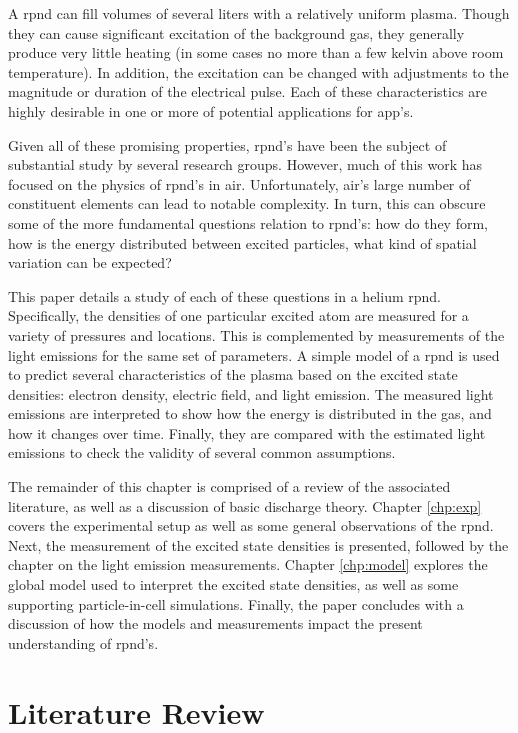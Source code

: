 A \acs{rpnd} can fill volumes of several liters with a relatively uniform
plasma. Though they can cause significant excitation of the background gas, they
generally produce very little heating (in some cases no more than a few kelvin
above room temperature). In addition, the excitation can be changed with
adjustments to the magnitude or duration of the electrical pulse. Each of these
characteristics are highly desirable in one or more of potential applications
for \acs{app}'s.

Given all of these promising properties, \acs{rpnd}'s have been the subject of
substantial study by several research groups. However, much of this work has
focused on the physics of \acs{rpnd}'s in air. Unfortunately, air's large number
of constituent elements can lead to notable complexity. In turn, this can
obscure some of the more fundamental questions relation to \acs{rpnd}'s: how do
they form, how is the energy distributed between excited particles, what kind of
spatial variation can be expected?

This paper details a study of each of these questions in a helium \acs{rpnd}.
Specifically, the densities of one particular excited atom are measured for a
variety of pressures and locations. This is complemented by measurements of the
light emissions for the same set of parameters. A simple model of a \acs{rpnd}
is used to predict several characteristics of the plasma based on the excited
state densities: electron density, electric field, and light emission. The
measured light emissions are interpreted to show how the energy is distributed
in the gas, and how it changes over time. Finally, they are compared with the
estimated light emissions to check the validity of several common assumptions.

The remainder of this chapter is comprised of a review of the associated
literature, as well as a discussion of basic discharge theory. Chapter
\ref{chp:exp} covers the experimental setup as well as some general observations
of the \acs{rpnd}. Next, the measurement of the excited state densities is
presented, followed by the chapter on the light emission measurements. Chapter
\ref{chp:model} explores the global model used to interpret the excited state
densities, as well as some supporting particle-in-cell simulations. Finally, the
paper concludes with a discussion of how the models and measurements impact the
present understanding of \acs{rpnd}'s.

\section{Literature Review}

